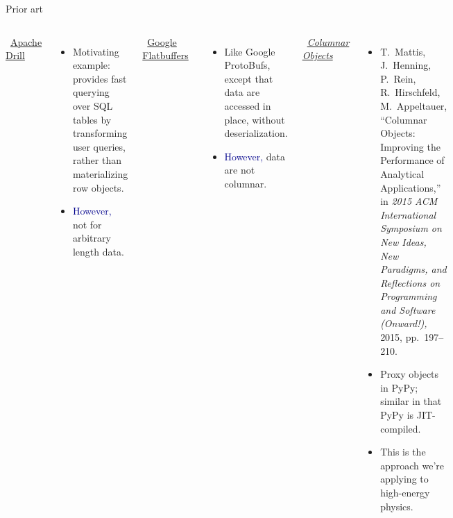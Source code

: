 \documentclass[aspectratio=169]{beamer}
\begin{document}
\begin{frame}{Prior art}
\vspace{0.35 cm}
\begin{columns}[t]
\mbox{ }\hfill\underline{\large Apache Drill}\hfill\mbox{ }

\vspace{0.25 cm}
\begin{itemize}
\item Motivating example: provides fast querying over SQL tables by transforming user queries, rather than materializing row objects.\vspace{3\baselineskip}\vspace{0.15 cm}
\item \textcolor{darkblue}{However,} not for arbitrary length data.
\end{itemize}

\mbox{ }\hfill\underline{\large Google Flatbuffers}\hfill\mbox{ }

\vspace{0.25 cm}
\begin{itemize}
\item Like Google ProtoBufs, except that data are accessed in place, without deserialization.\vspace{6\baselineskip}\vspace{0.15 cm}
\item \textcolor{darkblue}{However,} data are not columnar.
\end{itemize}

\mbox{ }\hfill\underline{\large\it Columnar Objects}\hfill\mbox{ }

\vspace{0.25 cm}
\scriptsize
\begin{itemize}
\item T.\ Mattis, J.\ Henning, P.\ Rein, R.\ Hirschfeld, M.\ Appeltauer, ``Columnar Objects: Improving the Performance of Analytical Applications,'' in {\it 2015 ACM International Symposium on New Ideas, New Paradigms, and Reflections on Programming and Software (Onward!),} 2015, pp.\ 197--210.
\item \normalsize Proxy objects in PyPy; similar in that PyPy is JIT-compiled.
\item \normalsize This is the approach we're applying to high-energy physics.
\end{itemize}
\end{columns}
\end{frame}
\end{document}
